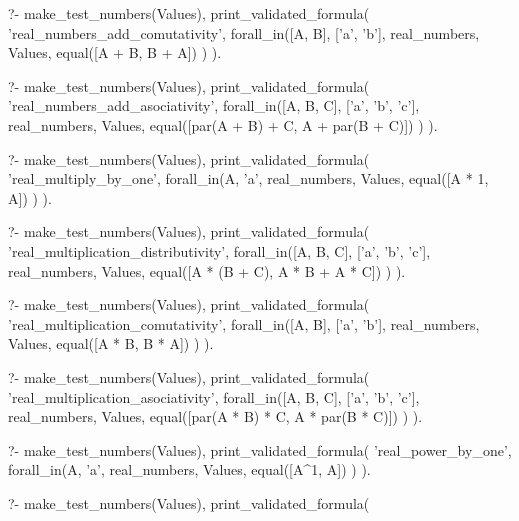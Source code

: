 \begin{fact}
\begin{prolog}
?-	make_test_numbers(Values),
	print_validated_formula(
		'real_numbers_add_comutativity',
		forall_in([A, B], ['a', 'b'], real_numbers, Values,
			equal([A + B, B + A])
		)
	).
\end{prolog}
\begin{prolog}
?-	make_test_numbers(Values),
	print_validated_formula(
		'real_numbers_add_asociativity',
		forall_in([A, B, C], ['a', 'b', 'c'], real_numbers, Values,
			equal([par(A + B) + C, A + par(B + C)])
		)
	).
\end{prolog}
\begin{prolog}
?-	make_test_numbers(Values),
	print_validated_formula(
		'real_multiply_by_one',
		forall_in(A, 'a', real_numbers, Values,
			equal([A * 1, A])
		)
	).				
\end{prolog}
\begin{prolog}
?-	make_test_numbers(Values),
	print_validated_formula(
		'real_multiplication_distributivity',
		forall_in([A, B, C], ['a', 'b', 'c'], real_numbers, Values,
			equal([A * (B + C), A * B + A * C])
		)
	).				
\end{prolog}
\begin{prolog}
?-	make_test_numbers(Values),
	print_validated_formula(
		'real_multiplication_comutativity',
		forall_in([A, B], ['a', 'b'], real_numbers, Values,
			equal([A * B, B * A])
		)
	).				
\end{prolog}
\begin{prolog}
?-	make_test_numbers(Values),
	print_validated_formula(
		'real_multiplication_asociativity',
		forall_in([A, B, C], ['a', 'b', 'c'], real_numbers, Values,
			equal([par(A * B) * C, A * par(B * C)])
		)
	).				
\end{prolog}
\begin{prolog}
?-	make_test_numbers(Values),
	print_validated_formula(
		'real_power_by_one',
		forall_in(A, 'a', real_numbers, Values,
			equal([A^1, A])
		)
	).				
\end{prolog}
\begin{prolog}
?-	make_test_numbers(Values),
	print_validated_formula(

\end{prolog}
\end{fact}
